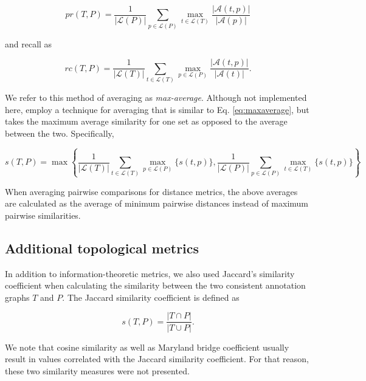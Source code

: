 \begin{equation}
pr(T, P)=\frac{1}{|\mathcal{L}(P)|}\underset{p\in\mathcal{L}(P)}{\sum}\underset{t\in\mathcal{L}(T)}{\max}\frac{|\mathcal{A}(t,p)|}{|\mathcal{A}(p)|}
\end{equation}

\noindent and recall as

\begin{equation}
rc(T, P)=\frac{1}{|\mathcal{L}(T)|}\underset{t\in\mathcal{L}(T)}{\sum}\underset{p\in\mathcal{L}(P)}{\max}\frac{|\mathcal{A}(t,p)|}{|\mathcal{A}(t)|}.
\end{equation}

\noindent We refer to this method of averaging as \emph{max-average}. Although not implemented here, \citet{Schlicker2006} employ a technique for averaging that is similar to Eq. \ref{eq:maxaverage}, but takes the maximum average similarity for one set as opposed to the average between the two. Specifically,

\begin{equation}
s(T, P)=\max \left\{ \frac{1}{|\mathcal{L}(T)|}\underset{t\in\mathcal{L}(T)}{\sum}\underset{p\in\mathcal{L}(P)}{\max}\{s(t,p)\},\frac{1}{|\mathcal{L}(P)|}\underset{p\in\mathcal{L}(P)}{\sum}\underset{t\in\mathcal{L}(T)}{\max}\{s(t,p)\} \right\} 
\end{equation}

\noindent When averaging pairwise comparisons for distance metrics, the above averages are calculated as the average of minimum pairwise distances instead of maximum pairwise similarities.  

\subsection{Additional topological metrics}

In addition to information-theoretic metrics, we also used Jaccard's similarity coefficient when calculating the similarity between the two consistent annotation graphs $T$ and $P$. The Jaccard similarity coefficient is defined as

\begin{equation}
s(T,P)=\frac{|T\cap P|}{|T\cup P|}.
\end{equation}

\noindent We note that cosine similarity as well as Maryland bridge coefficient \citep{Glazko2005} usually result in values correlated with the Jaccard similarity coefficient. For that reason, these two similarity measures were not presented.

